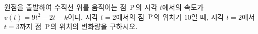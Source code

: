 원점을 출발하여 수직선 위를 움직이는 점~$\mathrm{P}$의 시각 $t$에서의 속도가 $v(t)=9t^2-2t-k$이다. 시각 $t=2$에서의 점~$\mathrm{P}$의 위치가 $10$일 때, 시각 $t=2$에서 $t=3$까지 점~$\mathrm{P}$의 위치의 변화량을 구하시오. 
